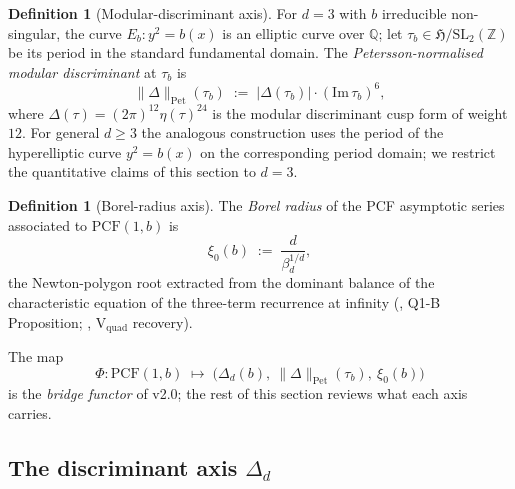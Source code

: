 \documentclass[11pt,a4paper]{article}
\theoremstyle{definition}
\newtheorem{definition}[conjecture]{Definition}
\theoremstyle{remark}
\newcommand{\PCF}{\mathrm{PCF}}
\newcommand{\Q}{\mathbb{Q}}
\newcommand{\Z}{\mathbb{Z}}
\newcommand{\HH}{\mathfrak{H}}
\newcommand{\PetN}[1]{\lVert #1 \rVert_{\mathrm{Pet}}}
\begin{document}
\begin{definition}[Modular-discriminant axis]
\label{def:moddisc-axis}
For $d=3$ with $b$ irreducible non-singular, the curve $E_b: y^2 = b(x)$
is an elliptic curve over $\Q$; let $\tau_b \in \HH/\mathrm{SL}_2(\Z)$
be its period in the standard fundamental domain. The
\emph{Petersson-normalised modular discriminant} at $\tau_b$ is
\begin{equation}
  \label{eq:petersson-norm}
  \PetN{\Delta}(\tau_b) \;:=\; |\Delta(\tau_b)| \cdot (\mathrm{Im}\,\tau_b)^{6},
\end{equation}
where $\Delta(\tau) = (2\pi)^{12} \eta(\tau)^{24}$ is the modular
discriminant cusp form of weight $12$. For general $d \geq 3$ the
analogous construction uses the period of the hyperelliptic curve
$y^2 = b(x)$ on the corresponding period domain; we restrict the
quantitative claims of this section to $d=3$.
\end{definition}

\begin{definition}[Borel-radius axis]
\label{def:borel-axis}
The \emph{Borel radius} of the PCF asymptotic series associated to
$\PCF(1,b)$ is
\begin{equation}
  \label{eq:borel-radius}
  \xi_0(b) \;:=\; \frac{d}{\beta_d^{1/d}},
\end{equation}
the Newton-polygon root extracted from the dominant balance of the
characteristic equation of the three-term recurrence at infinity
(\cite{PCF2}, Q1-B Proposition; \cite{CT}, V$_{\mathrm{quad}}$
recovery).
\end{definition}

The map
\begin{equation}
  \label{eq:Phi-functor}
  \Phi : \PCF(1,b) \;\longmapsto\; \bigl(\Delta_d(b),\ \PetN{\Delta}(\tau_b),\ \xi_0(b)\bigr)
\end{equation}
is the \emph{bridge functor} of v2.0; the rest of this section reviews
what each axis carries.

\subsection{The discriminant axis \texorpdfstring{$\Delta_d$}{Delta\_d}}
\label{sec:triple-disc}
\end{document}
